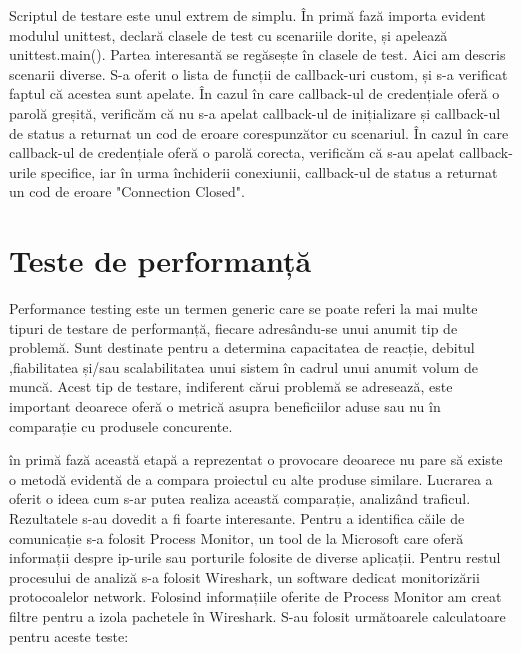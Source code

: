 Scriptul de testare este unul extrem de simplu. În primă fază importa evident modulul unittest, declară clasele de test cu scenariile dorite, și apelează unittest.main(). Partea interesantă se regăsește în clasele de test. Aici am descris scenarii diverse. S-a oferit o lista de funcții de callback-uri custom, și s-a verificat faptul că acestea sunt apelate. În cazul în care callback-ul de credențiale oferă o parolă greșită, verificăm că nu s-a apelat callback-ul de inițializare și callback-ul de status a returnat un cod de eroare corespunzător cu scenariul. În cazul în care callback-ul de credențiale oferă o parolă corecta, verificăm că s-au apelat callback-urile specifice, iar în urma închiderii conexiunii, callback-ul de status a returnat un cod de eroare "Connection Closed".

\section{Teste de performanță}

Performance testing este un termen generic care se poate referi la mai multe tipuri de testare de performanță, fiecare adresându-se unui anumit tip de problemă. Sunt destinate pentru a determina capacitatea de reacție, debitul ,fiabilitatea și/sau scalabilitatea unui sistem în cadrul unui anumit volum de muncă. Acest tip de testare, indiferent cărui problemă se adresează, este important deoarece oferă o metrică asupra beneficiilor aduse sau nu în comparație cu produsele concurente.

în primă fază această etapă a reprezentat o provocare deoarece nu pare să existe o metodă evidentă de a compara proiectul cu alte produse similare. Lucrarea \cite{perf} a oferit o ideea cum s-ar putea realiza această comparație, analizând traficul. Rezultatele s-au dovedit a fi foarte interesante. Pentru a identifica căile de comunicație s-a folosit Process Monitor, un tool de la Microsoft care oferă informații despre ip-urile sau porturile folosite de diverse aplicații. Pentru restul procesului de analiză s-a folosit Wireshark, un software dedicat monitorizării protocoalelor network. Folosind informațiile oferite de Process Monitor am creat filtre pentru a izola pachetele în Wireshark. S-au folosit următoarele calculatoare pentru aceste teste:

